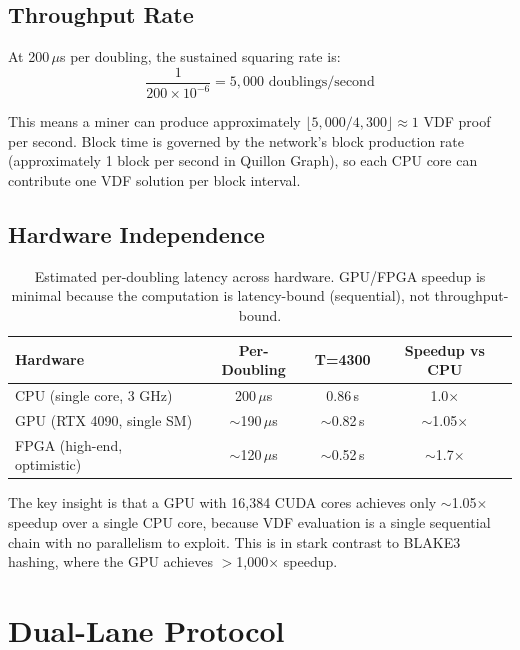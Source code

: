\documentclass[11pt,a4paper]{article}
\begin{document}
\subsection{Throughput Rate}

At 200\,$\mu$s per doubling, the sustained squaring rate is:
\begin{equation}
    \frac{1}{200 \times 10^{-6}} = 5{,}000 \text{ doublings/second}
\end{equation}

This means a miner can produce approximately $\lfloor 5{,}000 / 4{,}300 \rfloor \approx 1$ VDF proof per second. Block time is governed by the network's block production rate (approximately 1 block per second in Quillon Graph), so each CPU core can contribute one VDF solution per block interval.

\subsection{Hardware Independence}

\begin{table}[h]
\centering
\begin{tabular}{lccc}
\toprule
\textbf{Hardware} & \textbf{Per-Doubling} & \textbf{T=4300} & \textbf{Speedup vs CPU} \\
\midrule
CPU (single core, 3 GHz) & 200\,$\mu$s & 0.86\,s & 1.0$\times$ \\
GPU (RTX 4090, single SM) & $\sim$190\,$\mu$s & $\sim$0.82\,s & $\sim$1.05$\times$ \\
FPGA (high-end, optimistic) & $\sim$120\,$\mu$s & $\sim$0.52\,s & $\sim$1.7$\times$ \\
\bottomrule
\end{tabular}
\caption{Estimated per-doubling latency across hardware. GPU/FPGA speedup is minimal because the computation is latency-bound (sequential), not throughput-bound.}
\label{tab:hardware}
\end{table}

The key insight is that a GPU with 16,384 CUDA cores achieves only $\sim$1.05$\times$ speedup over a single CPU core, because VDF evaluation is a single sequential chain with no parallelism to exploit. This is in stark contrast to BLAKE3 hashing, where the GPU achieves $>$1{,}000$\times$ speedup.

\section{Dual-Lane Protocol}
\label{sec:dual-lane}
\end{document}
